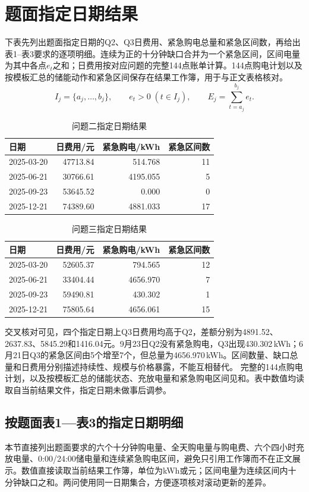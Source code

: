 \documentclass[UTF8,12pt,a4paper]{ctexart}
\begin{document}
\section{题面指定日期结果}
下表先列出题面指定日期的Q2、Q3日费用、紧急购电总量和紧急区间数，再给出表1--表3要求的逐项明细。连续为正的十分钟缺口合并为一个紧急区间，区间电量为其中各点$e_t$之和；日费用按对应问题的完整144点账单计算。144点购电计划以及按模板汇总的储能动作和紧急区间保存在结果工作簿，用于与正文表格核对。
\begin{equation}
I_j=\{a_j,\ldots,b_j\},\qquad e_t>0\;(t\in I_j),\qquad E_j=\sum_{t=a_j}^{b_j}e_t .
\end{equation}
\begin{table}[H]\centering\small\caption{问题二指定日期结果}\label{tab:q2dates}\begin{tabular}{lrrr}\toprule 日期&日费用/元&紧急购电/kWh&紧急区间数\\\midrule
2025-03-20&47713.84&514.768&11\\
2025-06-21&30766.61&4195.055&5\\
2025-09-23&53645.52&0.000&0\\
2025-12-21&74389.60&4881.033&17\\\bottomrule\end{tabular}\end{table}
\newpage
\begin{table}[H]\centering\small\caption{问题三指定日期结果}\label{tab:q3dates}\begin{tabular}{lrrr}\toprule 日期&日费用/元&紧急购电/kWh&紧急区间数\\\midrule
2025-03-20&52605.37&794.565&12\\
2025-06-21&33404.44&4656.970&7\\
2025-09-23&59490.81&430.302&1\\
2025-12-21&75805.64&4656.061&15\\\bottomrule\end{tabular}\end{table}
交叉核对可见，四个指定日期上Q3日费用均高于Q2，差额分别为4891.52、2637.83、5845.29和1416.04元。9月23日Q2没有紧急购电，Q3出现430.302\,kWh；6月21日Q3的紧急区间由5个增至7个，但总量为4656.970\,kWh。区间数量、缺口总量和日费用分别描述持续性、规模与价格暴露，不能互相替代。
完整的144点购电计划，以及按模板汇总的储能状态、充放电量和紧急购电区间见和。表中数值均读取自当前结果文件，指定日期未做事后调参。


\subsection{按题面表1—表3的指定日期明细}
本节直接列出题面要求的六个十分钟购电量、全天购电量与购电费、六个四小时充放电量、0:00/24:00储电量和连续紧急购电区间，避免只引用工作簿而不在正文展示。数值直接读取当前结果工作簿，单位为kWh或元；区间电量为连续区间内十分钟缺口之和。两问使用同一日期集合，方便逐项核对滚动更新的差异。
\end{document}
